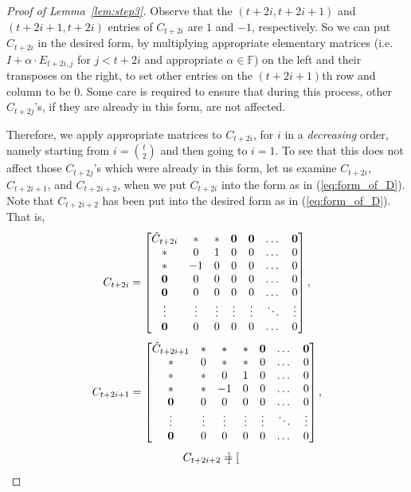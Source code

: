 \documentclass[10pt]{article}
\newcommand{\tuple}[1]{\mathbf{#1}}
\newcommand{\F}{\mathbb{F}}
\newcommand{\vzero}{\tuple{0}}
\newcommand{\vstar}{{\bf *}}
\begin{document}
\begin{proof}[Proof of Lemma~\ref{lem:step3}]
Observe that the $(t+2i, t+2i+1)$ and 
$(t+2i+1, t+2i)$ entries of $C_{t+2i}$ are $1$ and $-1$, respectively. So we can 
put $C_{t+2i}$ in the desired form, by multiplying appropriate elementary 
matrices  
(i.e. $I+\alpha\cdot E_{t+2i, j}$ for $j<t+2i$ and appropriate $\alpha\in\F$) on 
the left and their transposes on the right, 
to set other entries on the $(t+2i+1)$th row and 
column to be $0$. 
%
Some 
care is required to ensure that during 
this process, other $C_{t+2j}$'s, if they are already in this form, are not 
affected. 

Therefore, we apply appropriate matrices to 
%
$C_{t+2i}$, 
for $i$ in a \emph{decreasing} order, namely starting from $i=\binom{t}{2}$ and 
then 
going to $i=1$. To see that this does not affect those $C_{t+2j}$'s which were 
already in this form, let us examine $C_{t+2i}$, $C_{t+2i+1}$, and $C_{t+2i+2}$, 
when we put 
$C_{t+2i}$ into the form as in (\ref{eq:form_of_D}). Note that $C_{t+2i+2}$ 
has 
been put into the desired form as in (\ref{eq:form_of_D}). That is, 
$${\small
C_{t+2i}=\begin{bmatrix}
\hat C_{t+2i} & \vstar & \vstar & \vzero & \vzero& \dots & \vzero \\
\vstar & 0 & 1 & 0 & 0 & \dots & 0 \\
\vstar & -1 & 0 & 0 & 0 & \dots & 0 \\
\vzero & 0 & 0 & 0 & 0 & \dots & 0 \\
\vzero & 0 & 0 & 0 & 0 & \dots & 0 \\
\vdots & \vdots & \vdots & \vdots &\vdots & \ddots & \vdots \\
\vzero & 0 & 0 & 0 & 0 &\dots & 0 
\end{bmatrix},}$$
$${\small
C_{t+2i+1}=\begin{bmatrix}
\hat C_{t+2i+1} & \vstar & \vstar &  \vstar & \vzero & \dots & \vzero \\
\vstar & 0 & * & * & 0 &\dots & 0 \\
\vstar & * & 0 & 1 & 0 & \dots & 0 \\
\vstar & * & -1 & 0 & 0 & \dots & 0 \\
\vzero & 0 & 0 & 0 & 0 & \dots & 0 \\
\vdots & \vdots & \vdots & \vdots &\vdots & \ddots & \vdots \\
\vzero & 0 & 0 & 0 & 0 &\dots & 0 
\end{bmatrix},}$$
$${\small 
C_{t+2i+2}=\begin{bmatrix}

\end{bmatrix}}$$
\end{proof}
\end{document}

